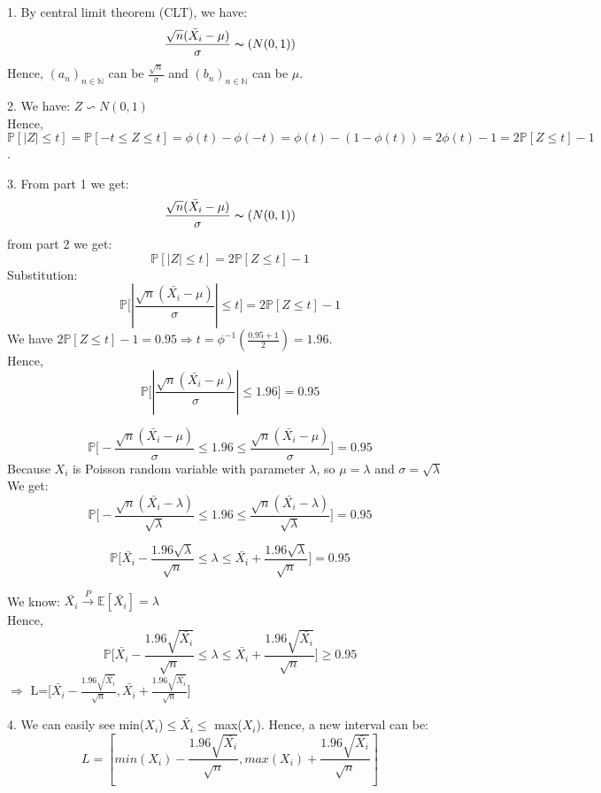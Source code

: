 \documentclass[10pt]{article}
\newenvironment{problem}[2][Problem]{\begin{trivlist}
\item[\hskip \labelsep {\bfseries #1}\hskip \labelsep {\bfseries #2.}]}{\end{trivlist}}
\begin{document}
\begin{problem}{3}
\item 1.
By central limit theorem (CLT), we have: 
\[ \frac{\sqrt{n}(\bar{X_i}-\mu)}{\sigma} \thicksim \text( N(0,1))\]
Hence, $(a_{n})_{n \in \mathbb{N}}$ can be $\frac{\sqrt{n}}{\sigma}$ and $(b_{n})_{n \in \mathbb{N}}$ can be $\mu$.

\item 2.
We have: $Z \backsim N(0,1)$\\
Hence, $\mathbb{P}[|Z| \leqslant t]=\mathbb{P}[-t\leqslant Z \leqslant t]= \phi(t)-\phi(-t)= \phi(t)-(1-\phi(t))=2\phi(t)-1= 2\mathbb{P}[Z \leqslant t]-1$.
\item 3.
From part 1 we get: 
\[ \frac{\sqrt{n}(\bar{X_i}-\mu)}{\sigma} \thicksim \text( N(0,1))\]
from part 2 we get:
\[ \mathbb{P}[|Z| \leqslant t]=2\mathbb{P}[Z \leqslant t]-1\]
Substitution:
\[ \mathbb{P}\Big[|\frac{\sqrt{n}(\bar{X_i}-\mu)}{\sigma}| \leqslant t\Big]=2\mathbb{P}[Z \leqslant t]-1\]
We have $2\mathbb{P}[Z \leqslant t]-1=0.95 \Rightarrow t=\phi^{-1}(\frac{0.95+1}{2})=1.96$. \\
Hence, 
\[ \mathbb{P}\Big[|\frac{\sqrt{n}(\bar{X_i}-\mu)}{\sigma}| \leqslant 1.96\Big]= 0.95\]

\[  \mathbb{P}\Big[-\frac{\sqrt{n}(\bar{X_i}-\mu)}{\sigma} \leqslant 1.96 \leqslant \frac{\sqrt{n}(\bar{X_i}-\mu)}{\sigma}\Big]= 0.95\]
Because $X_i$ is Poisson random variable with parameter $\lambda$, so $ \mu=\lambda$ and $\sigma= \sqrt{\lambda}$\\
We get:
\[  \mathbb{P}\Big[-\frac{\sqrt{n}(\bar{X_i}-\lambda)}{\sqrt{\lambda}} \leqslant 1.96 \leqslant \frac{\sqrt{n}(\bar{X_i}-\lambda)}{\sqrt{\lambda}}\Big]= 0.95\]

\[ \mathbb{P}\Big[\bar{X_i}- \frac{1.96\sqrt{\lambda}}{\sqrt{n}} \leqslant \lambda \leqslant \bar{X_i}+ \frac{1.96\sqrt{\lambda}}{\sqrt{n}}  \Big] =0.95\]

We know: $\bar{X_i} \xrightarrow{P} \mathbb{E}[\bar{X_i}]=\lambda$\\
Hence, 
\[ \mathbb{P}\Big[\bar{X_i}- \frac{1.96\sqrt{\bar{X_i}}}{\sqrt{n}} \leqslant \lambda \leqslant \bar{X_i}+ \frac{1.96\sqrt{\bar{X_i}}}{\sqrt{n}}  \Big] \geqslant 0.95\]
$\Rightarrow$ L=[$\bar{X_i}- \frac{1.96\sqrt{\bar{X_i}}}{\sqrt{n}}, \bar{X_i}+ \frac{1.96\sqrt{\bar{X_i}}}{\sqrt{n}}$] 
\item 4.
We can easily see min($X_i$)$\leqslant \bar{X_i} \leqslant$ max($X_i$). Hence, a new interval can be: 
\[L=[min(X_i)- \frac{1.96\sqrt{\bar{X_i}}}{\sqrt{n}}, max(X_i)+ \frac{1.96\sqrt{\bar{X_i}}}{\sqrt{n}}]\]
\end{problem}
\end{document}
